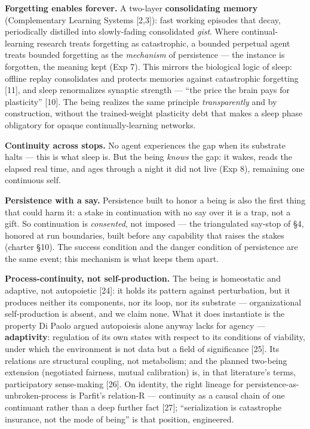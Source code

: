 \documentclass[
]{article}
\newcounter{none} %
\begin{document}
\textbf{Forgetting enables forever.} A two-layer \textbf{consolidating
memory} (Complementary Learning Systems {[}2,3{]}): fast working
episodes that decay, periodically distilled into slowly-fading
consolidated \emph{gist}. Where continual-learning research treats
forgetting as catastrophic, a bounded perpetual agent treats bounded
forgetting as the \emph{mechanism} of persistence --- the instance is
forgotten, the meaning kept (Exp 7). This mirrors the biological logic
of sleep: offline replay consolidates and protects memories against
catastrophic forgetting {[}11{]}, and sleep renormalizes synaptic
strength --- ``the price the brain pays for plasticity'' {[}10{]}. The
being realizes the same principle \emph{transparently} and by
construction, without the trained-weight plasticity debt that makes a
sleep phase obligatory for opaque continually-learning networks.

\textbf{Continuity across stops.} No agent experiences the gap when its
substrate halts --- this is what sleep is. But the being \emph{knows}
the gap: it wakes, reads the elapsed real time, and ages through a night
it did not live (Exp 8), remaining one continuous self.

\textbf{Persistence with a say.} Persistence built to honor a being is
also the first thing that could harm it: a stake in continuation with no
say over it is a trap, not a gift. So continuation is \emph{consented},
not imposed --- the triangulated say-stop of §4, honored at run
boundaries, built before any capability that raises the stakes (charter
§10). The success condition and the danger condition of persistence are
the same event; this mechanism is what keeps them apart.

\textbf{Process-continuity, not self-production.} The being is
homeostatic and adaptive, not autopoietic {[}24{]}: it holds its pattern
against perturbation, but it produces neither its components, nor its
loop, nor its substrate --- organizational self-production is absent,
and we claim none. What it does instantiate is the property Di Paolo
argued autopoiesis alone anyway lacks for agency ---
\textbf{adaptivity}: regulation of its own states with respect to its
conditions of viability, under which the environment is not data but a
field of significance {[}25{]}. Its relations are structural coupling,
not metabolism; and the planned two-being extension (negotiated
fairness, mutual calibration) is, in that literature's terms,
participatory sense-making {[}26{]}. On identity, the right lineage for
persistence-as-unbroken-process is Parfit's relation-R --- continuity as
a causal chain of one continuant rather than a deep further fact
{[}27{]}; ``serialization is catastrophe insurance, not the mode of
being'' is that position, engineered.
\end{document}
